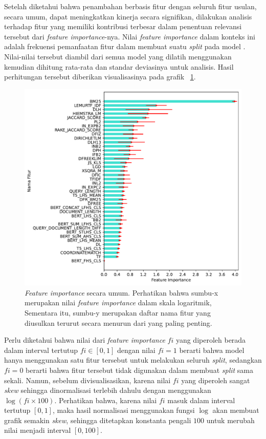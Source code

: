 Setelah diketahui bahwa penambahan \reranker{} berbasis fitur dengan seluruh fitur usulan, secara umum, dapat meningkatkan kinerja secara signifikan, dilakukan analisis terhadap fitur yang memiliki kontribusi terbesar dalam penentuan relevansi tersebut dari \textit{feature importance}-nya. Nilai \textit{feature importance} dalam konteks ini adalah frekuensi pemanfaatan fitur dalam membuat suatu \textit{split} pada model \lambdamart{}. Nilai-nilai tersebut diambil dari semua model \lambdamart{} yang dilatih menggunakan \fcv{} kemudian dihitung rata-rata dan standar deviasinya untuk analisis. Hasil perhitungan tersebut diberikan visualisasinya pada grafik \gambar{}~\ref{grafik:Feature Importance All}.
\begin{figure}[!ht]
    \centering
    \includegraphics[scale=0.725]{assets/pdfs/Feature Importance Distribution Log.pdf}
    \caption{\textit{Feature importance} secara umum. Perhatikan bahwa sumbu-x merupakan nilai \textit{feature importance} dalam skala logaritmik, Sementara itu, sumbu-y merupakan daftar nama fitur yang diusulkan terurut secara menurun dari yang paling penting.}
    \label{grafik:Feature Importance All}
\end{figure}
Perlu diketahui bahwa nilai dari \textit{feature importance} $fi$ yang diperoleh berada dalam interval tertutup $fi\in[0,1]$ dengan nilai $fi=1$ berarti bahwa model hanya menggunakan satu fitur tersebut untuk melakukan seluruh \textit{split}, sedangkan $fi=0$ berarti bahwa fitur tersebut tidak digunakan dalam membuat \textit{split} sama sekali. Namun, sebelum divisualisasikan, karena nilai $fi$ yang diperoleh sangat \textit{skew} sehingga dinormalisasi terlebih dahulu dengan menggunakan $\log(fi \times 100)$. Perhatikan bahwa, karena nilai $fi$ masuk dalam interval tertutup $[0,1]$, maka hasil normalisasi menggunakan fungsi $\log$ akan membuat grafik semakin \textit{skew}, sehingga ditetapkan konstanta pengali $100$ untuk merubah nilai menjadi interval $[0,100]$.

